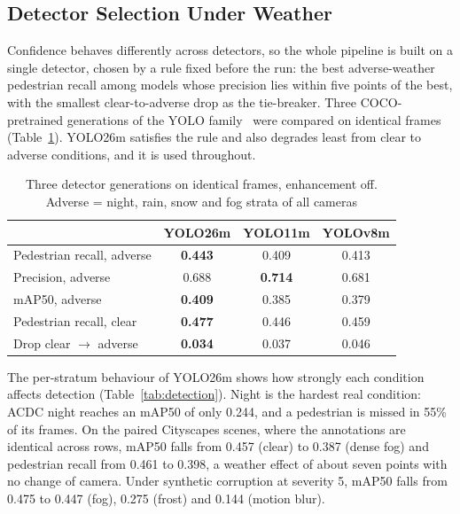 \documentclass[pdflatex,sn-mathphys-num]{sn-jnl}
\begin{document}
\subsection{Detector Selection Under Weather}

Confidence behaves differently across detectors, so the whole pipeline is built on a single detector, chosen by a rule fixed before the run: the best adverse-weather pedestrian recall among models whose precision lies within five points of the best, with the smallest clear-to-adverse drop as the tie-breaker. Three COCO-pretrained generations of the YOLO family~\cite{ultralytics,terven2023yolo} were compared on identical frames (Table~\ref{tab:detectors}). YOLO26m satisfies the rule and also degrades least from clear to adverse conditions, and it is used throughout.

\begin{table}[t]
\caption{Three detector generations on identical frames, enhancement off. Adverse = night, rain, snow and fog strata of all cameras}
\label{tab:detectors}
\begin{tabular}{@{}lccc@{}}
\toprule
& YOLO26m & YOLO11m & YOLOv8m \\
\midrule
Pedestrian recall, adverse & \textbf{0.443} & 0.409 & 0.413 \\
Precision, adverse & 0.688 & \textbf{0.714} & 0.681 \\
mAP50, adverse & \textbf{0.409} & 0.385 & 0.379 \\
Pedestrian recall, clear & \textbf{0.477} & 0.446 & 0.459 \\
Drop clear $\rightarrow$ adverse & \textbf{0.034} & 0.037 & 0.046 \\
\bottomrule
\end{tabular}
\end{table}

The per-stratum behaviour of YOLO26m shows how strongly each condition affects detection (Table~\ref{tab:detection}). Night is the hardest real condition: ACDC night reaches an mAP50 of only 0.244, and a pedestrian is missed in 55\% of its frames. On the paired Cityscapes scenes, where the annotations are identical across rows, mAP50 falls from 0.457 (clear) to 0.387 (dense fog) and pedestrian recall from 0.461 to 0.398, a weather effect of about seven points with no change of camera. Under synthetic corruption at severity 5, mAP50 falls from 0.475 to 0.447 (fog), 0.275 (frost) and 0.144 (motion blur).
\end{document}
